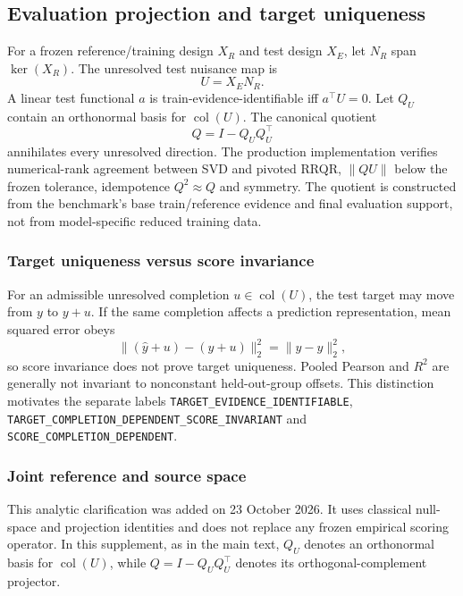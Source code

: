 \documentclass[11pt]{article}
\begin{document}
\subsection{Evaluation projection and target uniqueness}
For a frozen reference/training design $X_R$ and test design $X_E$, let $N_R$ span $\ker(X_R)$. The unresolved test nuisance map is
\[
U=X_EN_R.
\]
A linear test functional $a$ is train-evidence-identifiable iff $a^\top U=0$. Let $Q_U$ contain an orthonormal basis for $\operatorname{col}(U)$. The canonical quotient
\[
Q=I-Q_UQ_U^\top
\]
annihilates every unresolved direction. The production implementation verifies numerical-rank agreement between SVD and pivoted RRQR, $\|QU\|$ below the frozen tolerance, idempotence $Q^2\approx Q$ and symmetry. The quotient is constructed from the benchmark's base train/reference evidence and final evaluation support, not from model-specific reduced training data.

\subsubsection{Target uniqueness versus score invariance}
For an admissible unresolved completion $u\in\operatorname{col}(U)$, the test target may move from $y$ to $y+u$. If the same completion affects a prediction representation, mean squared error obeys
\[
\|(\hat y+u)-(y+u)\|_2^2=\|\hat y-y\|_2^2,
\]
so score invariance does not prove target uniqueness. Pooled Pearson and $R^2$ are generally not invariant to nonconstant held-out-group offsets. This distinction motivates the separate labels \texttt{TARGET\_EVIDENCE\_IDENTIFIABLE}, \texttt{TARGET\_COMPLETION\_DEPENDENT\_SCORE\_INVARIANT} and \texttt{SCORE\_COMPLETION\_DEPENDENT}.


\subsubsection{Joint reference and source space}
\label{sec:jointsource}
This analytic clarification was added on 23 October 2026. It uses classical null-space and projection identities and does not replace any frozen empirical scoring operator. In this supplement, as in the main text, $Q_U$ denotes an orthonormal basis for $\operatorname{col}(U)$, while $Q=I-Q_UQ_U^\top$ denotes its orthogonal-complement projector.
\end{document}
